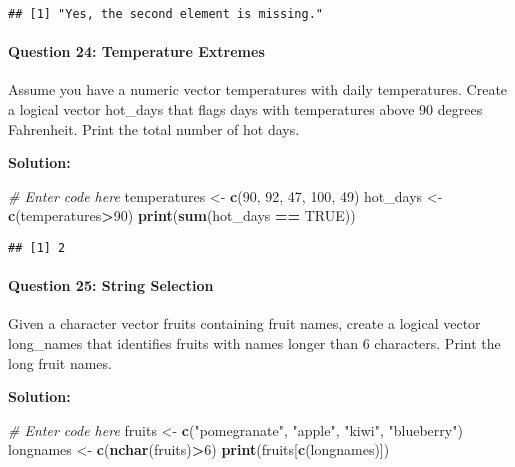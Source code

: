 \documentclass[
]{article}
\newenvironment{Shaded}{\begin{snugshade}}{\end{snugshade}}
\newcommand{\CommentTok}[1]{\textcolor[rgb]{0.56,0.35,0.01}{\textit{#1}}}
\newcommand{\ConstantTok}[1]{\textcolor[rgb]{0.56,0.35,0.01}{#1}}
\newcommand{\DecValTok}[1]{\textcolor[rgb]{0.00,0.00,0.81}{#1}}
\newcommand{\FunctionTok}[1]{\textcolor[rgb]{0.13,0.29,0.53}{\textbf{#1}}}
\newcommand{\NormalTok}[1]{#1}
\newcommand{\OtherTok}[1]{\textcolor[rgb]{0.56,0.35,0.01}{#1}}
\newcommand{\SpecialCharTok}[1]{\textcolor[rgb]{0.81,0.36,0.00}{\textbf{#1}}}
\newcommand{\StringTok}[1]{\textcolor[rgb]{0.31,0.60,0.02}{#1}}
\begin{document}
\begin{verbatim}
## [1] "Yes, the second element is missing."
\end{verbatim}

\hypertarget{question-24-temperature-extremes}{%
\paragraph{Question 24: Temperature
Extremes}\label{question-24-temperature-extremes}}

Assume you have a numeric vector temperatures with daily temperatures.
Create a logical vector hot\_days that flags days with temperatures
above 90 degrees Fahrenheit. Print the total number of hot days.

\textbf{Solution:}

\begin{Shaded}
\begin{Highlighting}[]
\CommentTok{\# Enter code here}
\NormalTok{temperatures }\OtherTok{\textless{}{-}} \FunctionTok{c}\NormalTok{(}\DecValTok{90}\NormalTok{, }\DecValTok{92}\NormalTok{, }\DecValTok{47}\NormalTok{, }\DecValTok{100}\NormalTok{, }\DecValTok{49}\NormalTok{)}
\NormalTok{hot\_days }\OtherTok{\textless{}{-}} \FunctionTok{c}\NormalTok{(temperatures}\SpecialCharTok{\textgreater{}}\DecValTok{90}\NormalTok{)}
\FunctionTok{print}\NormalTok{(}\FunctionTok{sum}\NormalTok{(hot\_days }\SpecialCharTok{==} \ConstantTok{TRUE}\NormalTok{))}
\end{Highlighting}
\end{Shaded}

\begin{verbatim}
## [1] 2
\end{verbatim}

\hypertarget{question-25-string-selection}{%
\paragraph{Question 25: String
Selection}\label{question-25-string-selection}}

Given a character vector fruits containing fruit names, create a logical
vector long\_names that identifies fruits with names longer than 6
characters. Print the long fruit names.

\textbf{Solution:}

\begin{Shaded}
\begin{Highlighting}[]
\CommentTok{\# Enter code here}
\NormalTok{fruits }\OtherTok{\textless{}{-}} \FunctionTok{c}\NormalTok{(}\StringTok{"pomegranate"}\NormalTok{, }\StringTok{"apple"}\NormalTok{, }\StringTok{"kiwi"}\NormalTok{, }\StringTok{"blueberry"}\NormalTok{)}
\NormalTok{longnames }\OtherTok{\textless{}{-}} \FunctionTok{c}\NormalTok{(}\FunctionTok{nchar}\NormalTok{(fruits)}\SpecialCharTok{\textgreater{}}\DecValTok{6}\NormalTok{)}
\FunctionTok{print}\NormalTok{(fruits[}\FunctionTok{c}\NormalTok{(longnames)])}
\end{Highlighting}
\end{Shaded}
\end{document}
